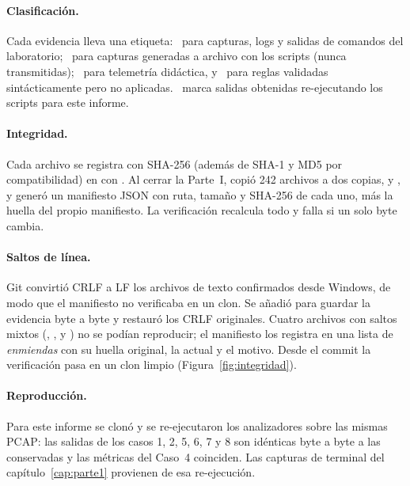\paragraph{Clasificación.} Cada evidencia lleva una etiqueta: \REAL\ para capturas, logs y salidas de comandos del laboratorio; \SINT\ para capturas generadas a archivo con los scripts  (nunca transmitidas); \SIM\ para telemetría didáctica, y \PROP\ para reglas validadas sintácticamente pero no aplicadas. \ANA\ marca salidas obtenidas re-ejecutando los scripts para este informe.

\paragraph{Integridad.} Cada archivo se registra con SHA-256 (además de SHA-1 y MD5 por compatibilidad) en  con . Al cerrar la Parte~I,  copió 242 archivos a dos copias,  y , y generó un manifiesto JSON con ruta, tamaño y SHA-256 de cada uno, más la huella del propio manifiesto. La verificación recalcula todo y falla si un solo byte cambia.

\paragraph{Saltos de línea.} Git convirtió CRLF a LF los archivos de texto confirmados desde Windows, de modo que el manifiesto no verificaba en un clon. Se añadió  para guardar la evidencia byte a byte y  restauró los CRLF originales. Cuatro archivos con saltos mixtos (, ,  y ) no se podían reproducir; el manifiesto los registra en una lista de \emph{enmiendas} con su huella original, la actual y el motivo. Desde el commit  la verificación pasa en un clon limpio (Figura~\ref{fig:integridad}).

\paragraph{Reproducción.} Para este informe se clonó  y se re-ejecutaron los analizadores sobre las mismas PCAP: las salidas de los casos 1, 2, 5, 6, 7 y 8 son idénticas byte a byte a las conservadas y las métricas del Caso~4 coinciden. Las capturas de terminal del capítulo~\ref{cap:parte1} provienen de esa re-ejecución.

